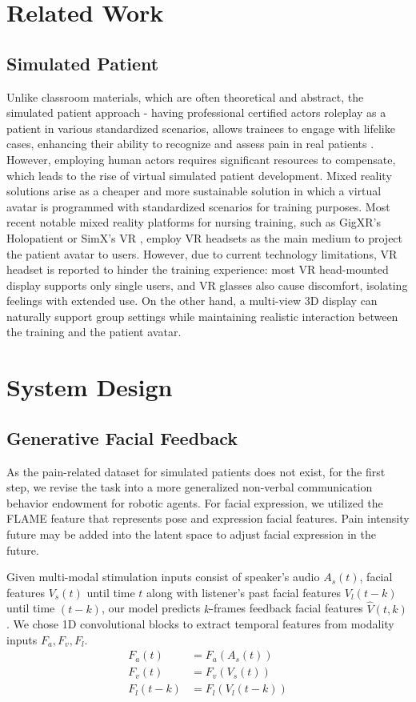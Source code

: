 \documentclass[a4paper,twocolumn]{article}
\begin{document}
\section{Related Work}

\subsection{Simulated Patient}
Unlike classroom materials, which are often theoretical and abstract, the simulated patient approach - having professional certified actors roleplay as a patient in various standardized scenarios, allows trainees to engage with lifelike cases, enhancing their ability to recognize and assess pain in real patients \cite{ma2023standardized}. However, employing human actors requires significant resources to compensate, which leads to the rise of virtual simulated patient development. Mixed reality solutions arise as a cheaper and more sustainable solution in which a virtual avatar is programmed with standardized scenarios for training purposes. Most recent notable mixed reality platforms for nursing training, such as GigXR's Holopatient \cite{kang2023effect} or SimX's VR \cite{shah2023orchestrating}, employ VR headsets as the main medium to project the patient avatar to users. However, due to current technology limitations, VR headset is reported to hinder the training experience: most VR head-mounted display supports only single users, and VR glasses also cause discomfort, isolating feelings with extended use. On the other hand, a multi-view 3D display can naturally support group settings while maintaining realistic interaction between the training and the patient avatar.
\section{System Design}
\subsection{Generative Facial Feedback}
\label{sect:pred}
As the pain-related dataset for simulated patients does not exist, for the first step, we revise the task into a more generalized non-verbal communication behavior endowment for robotic agents. For facial expression, we utilized the FLAME feature \cite{FLAME:SiggraphAsia2017} that represents pose and expression facial features. Pain intensity future may be added into the latent space to adjust facial expression in the future.


Given multi-modal stimulation inputs consist of speaker's audio $A_s(t)$, facial features $V_s(t)$ until time $t$ along with listener's past facial features $V_l(t-k)$ until time $(t-k)$, our model predicts $k$-frames feedback facial features $\hat{V}(t,k)$. We chose 1D convolutional blocks to extract temporal features from modality inputs $F_a, F_v, F_l$.
\begin{align*}
F_a(t) &= F_a(A_s(t)) \\
F_v(t) &= F_v(V_s(t)) \\
F_l(t-k) &= F_l(V_l(t-k))
\end{align*}
\end{document}
